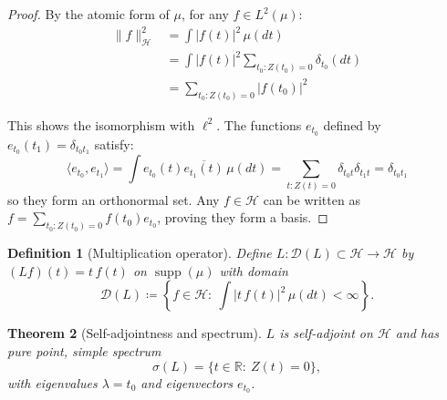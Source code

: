 \documentclass{article}
\newtheorem{theorem}{Theorem}[section]
\newtheorem{definition}[theorem]{Definition}
\begin{document}
\begin{proof}
By the atomic form of $\mu$, for any $f\in L^2(\mu)$:
\begin{align}
\|f\|_{\mathcal{H}}^2 &= \int |f(t)|^2\,\mu(dt)\\
&= \int |f(t)|^2\sum_{t_0:Z(t_0)=0}\delta_{t_0}(dt)\\
&= \sum_{t_0:Z(t_0)=0} |f(t_0)|^2
\end{align}

This shows the isomorphism with $\ell^2$. The functions $e_{t_0}$ defined by $e_{t_0}(t_1)=\delta_{t_0 t_1}$ satisfy:
\[
\langle e_{t_0}, e_{t_1}\rangle = \int e_{t_0}(t)\overline{e_{t_1}(t)}\,\mu(dt) = \sum_{t:Z(t)=0} \delta_{t_0 t}\delta_{t_1 t} = \delta_{t_0 t_1}
\]
so they form an orthonormal set. Any $f\in\mathcal{H}$ can be written as $f=\sum_{t_0:Z(t_0)=0} f(t_0)e_{t_0}$, proving they form a basis.
\end{proof}

\begin{definition}[Multiplication operator]\label{def:L}
Define $L:\mathcal{D}(L)\subset\mathcal{H}\to\mathcal{H}$ by $(Lf)(t)=t\,f(t)$ on $\operatorname{supp}(\mu)$ with domain
\[
\mathcal{D}(L)\coloneqq \left\{f\in\mathcal{H}:\ \int |t\,f(t)|^2\,\mu(dt)<\infty\right\}.
\]
\end{definition}

\begin{theorem}[Self-adjointness and spectrum]\label{thm:spectrum}
$L$ is self-adjoint on $\mathcal{H}$ and has pure point, simple spectrum
\[
\sigma(L)=\{t\in\mathbb{R}:\ Z(t)=0\},
\]
with eigenvalues $\lambda=t_0$ and eigenvectors $e_{t_0}$.
\end{theorem}
\end{document}
